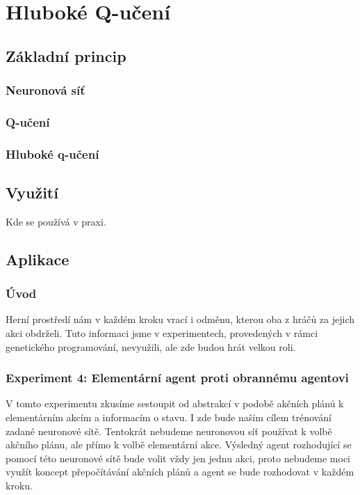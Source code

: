 \chapter{Hluboké Q-učení}

\section{Základní princip}
\subsection{Neuronová síť}

\subsection{Q-učení}
\subsection{Hluboké q-učení}

\section{Využití}
Kde se používá v praxi.


\section{Aplikace}
\subsection{Úvod}
Herní prostředí nám v každém kroku vrací i odměnu, kterou oba z hráčů za jejich akci obdrželi. Tuto informaci jsme v experimentech, provedených v rámci genetického programování, nevyužili, ale zde budou hrát velkou roli.


\subsection{Experiment 4: Elementární agent proti obrannému agentovi}
V tomto experimentu zkusíme sestoupit od abstrakcí v podobě akčních plánů k elementárním akcím a informacím o stavu.
I zde bude naším cílem trénování zadané neuronové sítě.
Tentokrát nebudeme neuronovou síť používat k volbě akčního plánu, ale přímo k volbě elementární akce.
Výsledný agent rozhodující se pomocí této neuronové sítě bude volit vždy jen jednu akci, proto nebudeme moci využít koncept přepočítávání akčních plánů a agent se bude rozhodovat v každém kroku.

